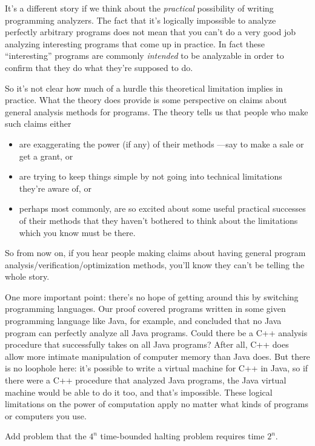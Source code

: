It's a different story if we think about the \emph{practical}
possibility of writing programming analyzers.  The fact that it's
logically impossible to analyze perfectly arbitrary programs does not
mean that you can't do a very good job analyzing interesting programs
that come up in practice.  In fact these ``interesting'' programs are
commonly \emph{intended} to be analyzable in order to confirm that
they do what they're supposed to do.

So it's not clear how much of a hurdle this theoretical limitation
implies in practice.  What the theory does provide is some perspective
on claims about general analysis methods for programs.  The theory
tells us that people who make such claims either

\begin{itemize}
\item are exaggerating the power (if any) of their methods ---say to make a
  sale or get a grant, or

\item are trying to keep things simple by not going into technical
  limitations they're aware of, or

\item perhaps most commonly, are so excited about some useful practical
    successes of their methods that they haven't bothered to think about
    the limitations which you know must be there.
\end{itemize}

So from now on, if you hear people making claims about having general
program analysis/verification/optimization methods, you'll know they can't
be telling the whole story.

One more important point: there's no hope of getting around this by
switching programming languages.  Our proof covered programs written
in some given programming language like Java, for example, and
concluded that no Java program can perfectly analyze all Java
programs.  Could there be a C++ analysis procedure that successfully
takes on all Java programs?  After all, C++ does allow more intimate
manipulation of computer memory than Java does.  But there is no
loophole here: it's possible to write a virtual machine for C++ in
Java, so if there were a C++ procedure that analyzed Java programs,
the Java virtual machine would be able to do it too, and that's
impossible.  These logical limitations on the power of computation
apply no matter what kinds of programs or computers you use.

\begin{problems}

\classproblems
{}

\homeworkproblems
{}

\begin{editingnotes}
Add problem that the $4^n$ time-bounded halting problem requires time
$2^n$.
\end{editingnotes}

\examproblems
{}

\end{problems}

